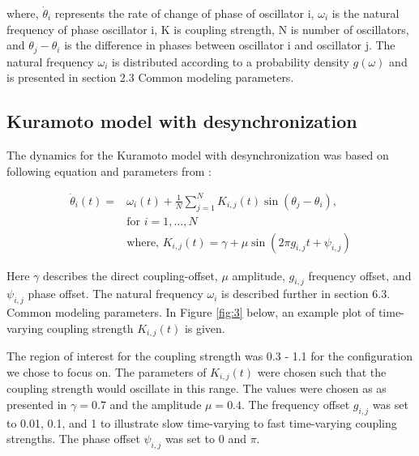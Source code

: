 \documentclass{article}
\begin{document}
where, $\dot{\theta}_i$ represents the rate of change of phase of oscillator i, $\omega_i$ is the natural frequency of phase oscillator i, K is coupling strength, N is number of oscillators, and $\theta_j - \theta_i$ is the difference in phases between oscillator i and oscillator j. The natural frequency $\omega_i$ is distributed according to a probability density $g(\omega)$ and is presented in section 2.3 Common modeling parameters.

\subsection{Kuramoto model with desynchronization}

The dynamics for the Kuramoto model with desynchronization was based on following equation and parameters from \cite{Cumin}:

\begin{align}
    \dot{\theta}_i(t) = &\omega_i(t) + \frac{1}{N} \sum_{j=1}^{N} K_{i,j}(t) \sin(\theta_j - \theta_i),\\
    &\text{for }i = 1, \ldots, N \\
    &\text{where, }K_{i,j}(t) = \gamma + \mu \sin(2\pi g_{i,j} t + \psi_{i,j})
\end{align}

Here \( \gamma \) describes the direct coupling-offset, \( \mu \) amplitude, \( g_{i,j} \) frequency offset, and \( \psi_{i,j} \) phase offset. The natural frequency \( \omega_i \) is described further in section 6.3. Common modeling parameters. In Figure \ref{fig:3} below, an example plot of time-varying coupling strength \( K_{i,j}(t) \) is given.

The region of interest for the coupling strength was 0.3 - 1.1 for the configuration we chose to focus on. The parameters of \( K_{i,j}(t) \) were chosen such that the coupling strength would oscillate in this range. The values were chosen as as presented in \cite{Cumin} \( \gamma = 0.7 \) and the amplitude \( \mu = 0.4\). The frequency offset \( g_{i,j} \) was set to 0.01, 0.1, and 1 to illustrate slow time-varying to fast time-varying coupling strengths. The phase offset \( \psi_{i,j} \) was set to 0 and \( \pi \).
\end{document}
